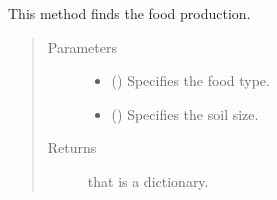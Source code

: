 \documentclass[letterpaper,10pt,english]{sphinxmanual}
\begin{document}
\begin{fulllineitems}
\begin{fulllineitems}
\label{\detokenize{farming:farming.part3_fertilizer.Farm.calculate_food_production}}
\sphinxAtStartPar
This method finds the food production.
\begin{quote}\begin{description}
\item[{Parameters}] \leavevmode\begin{itemize}
\item {} 
\sphinxAtStartPar
{} ({\hyperref[\detokenize{farming:farming.part3_fertilizer.FoodType}]{}}) \textendash{} Specifies the food type.

\item {} 
\sphinxAtStartPar
{} () \textendash{} Specifies the soil size.

\end{itemize}

\item[{Returns}] \leavevmode
\sphinxAtStartPar
{} that is a dictionary.

\end{description}\end{quote}

\end{fulllineitems}


\end{fulllineitems}

\end{document}
